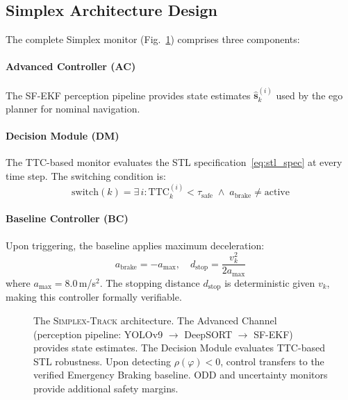 \documentclass[conference]{IEEEtran}
\begin{document}
\subsection{Simplex Architecture Design}
\label{sec:simplex}

The complete Simplex monitor (Fig.~\ref{fig:system_arch}) comprises three components:

\paragraph{Advanced Controller (AC)}
The SF-EKF perception pipeline provides state estimates $\hat{\mathbf{s}}_k^{(i)}$ used by the ego planner for nominal navigation.

\paragraph{Decision Module (DM)}
The TTC-based monitor evaluates the STL specification~\eqref{eq:stl_spec} at every time step. The switching condition is:
\begin{equation}
    \text{switch}(k) = \exists\, i : \mathrm{TTC}_k^{(i)} < \tau_{\text{safe}} \;\land\; a_{\text{brake}} \neq \text{active}
    \label{eq:switch}
\end{equation}

\paragraph{Baseline Controller (BC)}
Upon triggering, the baseline applies maximum deceleration:
\begin{equation}
    a_{\text{brake}} = -a_{\max}, \quad d_{\text{stop}} = \frac{v_k^2}{2a_{\max}}
    \label{eq:braking}
\end{equation}
where $a_{\max} = 8.0$\,m/s$^2$. The stopping distance $d_{\text{stop}}$ is deterministic given $v_k$, making this controller formally verifiable.

\begin{figure}[t]
    \centering
    
    \caption{The \textsc{Simplex-Track} architecture. The Advanced Channel (perception pipeline: YOLOv9 $\to$ DeepSORT $\to$ SF-EKF) provides state estimates. The Decision Module evaluates TTC-based STL robustness. Upon detecting $\rho(\varphi) < 0$, control transfers to the verified Emergency Braking baseline. ODD and uncertainty monitors provide additional safety margins.}
    \label{fig:system_arch}
\end{figure}
\end{document}
